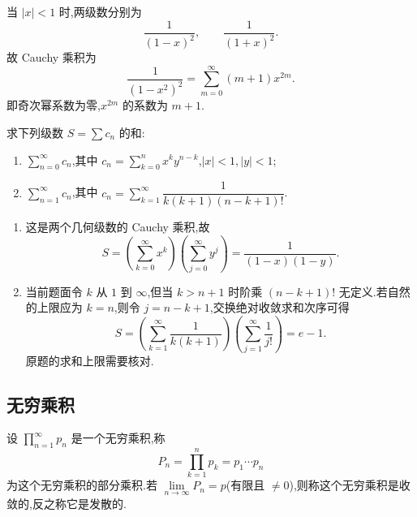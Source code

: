 \begin{solution}
    当 $|x|<1$ 时,两级数分别为
    \[
        \dfrac{1}{(1-x)^2},
        \qquad
        \dfrac{1}{(1+x)^2}.
    \]
    故 Cauchy 乘积为
    \[
        \dfrac{1}{(1-x^2)^2}
        =\sum\limits_{m=0}^{\infty}(m+1)x^{2m}.
    \]
    即奇次幂系数为零,$x^{2m}$ 的系数为 $m+1$.
\end{solution}

\begin{example}
    求下列级数 $S=\displaystyle\sum c_n$ 的和:
    \begin{enumerate}
        \item $\displaystyle\sum\limits_{n=0}^{\infty}c_n$,其中 $\displaystyle c_n=\sum\limits_{k=0}^nx^ky^{n-k}$,$|x|<1,|y|<1$;
        \item $\displaystyle\sum\limits_{n=1}^{\infty}c_n$,其中 $\displaystyle c_n=\sum\limits_{k=1}^{\infty}\dfrac{1}{k(k+1)(n-k+1)!}$.
    \end{enumerate}
\end{example}
\exampleblank

\begin{solution}
    \leavevmode
    \begin{enumerate}
        \item 这是两个几何级数的 Cauchy 乘积,故
              \[
                  S=\left(\sum\limits_{k=0}^{\infty}x^k\right)
                  \left(\sum\limits_{j=0}^{\infty}y^j\right)
                  =\boxed{\dfrac{1}{(1-x)(1-y)}}.
              \]
        \item 当前题面令 $k$ 从 $1$ 到 $\infty$,但当 $k>n+1$ 时阶乘
              $(n-k+1)!$ 无定义.若自然的上限应为 $k=n$,则令 $j=n-k+1$,交换绝对收敛求和次序可得
              \[
                  S=\left(\sum\limits_{k=1}^{\infty}\dfrac{1}{k(k+1)}\right)
                  \left(\sum\limits_{j=1}^{\infty}\dfrac{1}{j!}\right)
                  =\boxed{e-1}.
              \]
              原题的求和上限需要核对.
    \end{enumerate}
\end{solution}



\subsection{无穷乘积}

\begin{definition}
    设 $\displaystyle\prod\limits_{n=1}^{\infty}p_n$ 是一个无穷乘积,称
    \[
        P_n=\prod\limits_{k=1}^np_k=p_1\cdots p_n
    \]
    为这个无穷乘积的部分乘积.若 $\displaystyle\lim\limits_{n\to\infty}P_n=p$(有限且 $\neq0$),则称这个无穷乘积是收敛的,反之称它是发散的.
\end{definition}

